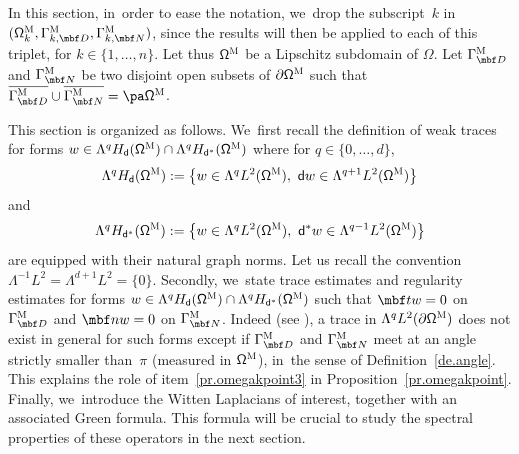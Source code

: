 In this section, in~order to ease the notation, we~drop the subscript~$k$ in
$(\mathsf \Omega^{\textsc{M}}_{k}, \Gamma^{\textsc{M}}_{k,\mbf D},
\Gamma^{\textsc{M}}_{k,\mbf N})$, since the results will then be applied to each of
this triplet, for $k \in \{1, \ldots,n\}$.
Let thus $\mathsf \Omega^{\textsc{M}}$ be a Lipschitz subdomain of
$\Omega$. Let $\Gamma^{\textsc{M}}_{\mbf D}$ and
$\Gamma^{\textsc{M}}_{\mbf N}$ be two disjoint open subsets of
$\partial \mathsf \Omega^{\textsc{M}}$ such that
$\overline{\Gamma^{\textsc{M}}_{\mbf D}} \cup
\overline{\Gamma^{\textsc{M}}_{\mbf N}} = \pa \mathsf
\Omega^{\textsc{M}}$.

This section is organized as follows. We~first recall the definition
of weak traces for forms $w\in \Lambda^q H_{\mathsf d} (\mathsf
\Omega^{\textsc{M}})\cap \Lambda^q H_{\mathsf d^*} (\mathsf
\Omega^{\textsc{M}})$
where for $q\in\{0,\ldots,d\}$,
\begin{equation}
\label{eq.H-d}
\Lambda^q H_{\mathsf d} (\mathsf \Omega^{\textsc{M}}):= \left\{w\in \Lambda^q L^2 (\mathsf \Omega^{\textsc{M}}),\ \mathsf dw\in\Lambda^{q+1} L^2 (\mathsf \Omega^{\textsc{M}})\right\}
\end{equation}
and
\begin{equation}
\label{eq.H-d*}
\Lambda^q H_{\mathsf d^*} (\mathsf \Omega^{\textsc{M}}):=\left\{w\in \Lambda^q L^2 (\mathsf \Omega^{\textsc{M}}),\ \mathsf d^*w\in\Lambda^{q-1} L^2 (\mathsf \Omega^{\textsc{M}})\right\}
\end{equation}
are equipped with their natural graph norms. Let us recall the
convention $ \Lambda^{-1} L^2=\Lambda^{d+1} L^2=\{0\}$.
Secondly, we~state trace estimates and regularity estimates for forms $w\in \Lambda^q H_{\mathsf d} (\mathsf \Omega^{\textsc{M}})\cap \Lambda^q H_{\mathsf d^*} (\mathsf \Omega^{\textsc{M}})$ such that $\mbf t w=0$ on $\Gamma^{\textsc{M}}_{\mbf D}$ and $\mbf n w=0$ on $\Gamma^{\textsc{M}}_{\mbf N}$.
Indeed (see \cite{brown-94,jakab-mitrea-mitrea-09}), a trace in $\Lambda^q L^2(\partial \mathsf
\Omega^{\textsc{M}})$ does not exist in general for such forms except if $\Gamma^{\textsc{M}}_{\mbf D}$ and $\Gamma^{\textsc{M}}_{\mbf N}$ meet at an angle strictly
smaller than~$\pi$ (measured in $\mathsf \Omega^{\textsc{M}}$), in~the
sense of
Definition~\ref{de.angle}. This explains the role of item~\eqref{pr.omegakpoint3} in
Proposition~\ref{pr.omegakpoint}. Finally, we~introduce the Witten
Laplacians of interest, together with an associated Green
formula. This formula will be crucial to study the spectral
properties of these operators in the next section.

